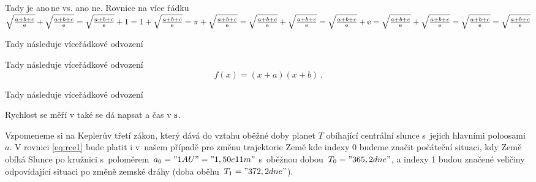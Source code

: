 \documentclass[twoside]{fksserie}
\begin{document}
\maketitle

%

\problemsheading %


\solutionheading %

Tady je ano\,ne vs. ano ne. Rovnice na více řádku
$
\sqrt{\frac{a+b+c}{\mathrm{e}}} + \sqrt{\frac{a+b+c}{\mathrm{e}}} =
\sqrt{\frac{a+b+c}{\mathrm{e}}} + 1 =
1 + \sqrt{\frac{a+b+c}{\mathrm{e}}} =
\pi + \sqrt{\frac{a+b+c}{\mathrm{e}}} =
\sqrt{\frac{a+b+c}{\mathrm{e}}} + \sqrt{\frac{a+b+c}{\mathrm{e}}} =
\sqrt{\frac{a+b+c}{\mathrm{e}}} + \mathrm{e} =
\sqrt{\frac{a+b+c}{\mathrm{e}}} + \sqrt{\frac{a+b+c}{\mathrm{e}}} =
\sqrt{\frac{a+b+c}{\mathrm{e}}} = \sqrt{\frac{a+b+c}{\mathrm{e}}}
$

Tady následuje víceřádkové odvození

Tady následuje víceřádkové odvození
\[
 f(x) = (x+a)(x+b)\,. \label{eq:rce2}
\]

Tady následuje víceřádkové odvození

Rychlost se měří v  také se dá napsat  a čas v $\jd{s}$.





Vzpomeneme si na Keplerův třetí zákon, který dává do vztahu oběžné 
doby planet $T$ obíhající centrální slunce s~jejich hlavními 
poloosami $a$. V rovnici \eqref{eq:rce1} bude platit i v~našem případě pro změnu
trajektorie Země
kde indexy 0 budeme značit počáteční situaci, kdy Země obíhá Slunce
po kružnici s~polo\-měrem~$a_0 = "1 AU" = "1,50e11 m"$ s~oběžnou dobou~$T_0 =
"365,2 dne"$,
a indexy 1 budou značené veličiny odpovídající 
situaci po změně zemské dráhy (doba oběhu~$T_1 = "372,2 dne"$).
\end{document}
